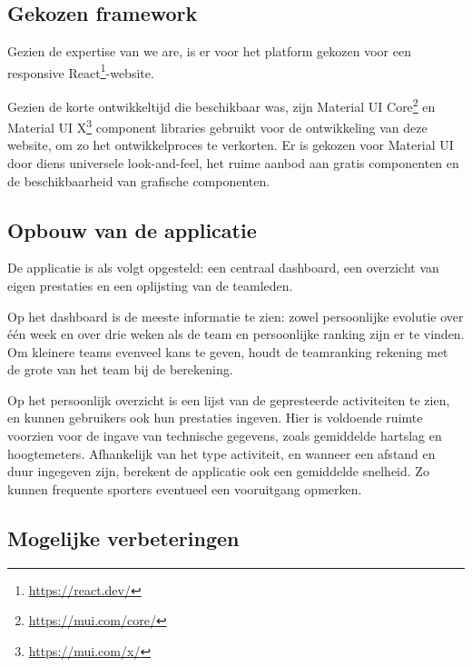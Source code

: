 \chapter{}%
\label{ch:proofofconcept}

\section{Gekozen framework}

Gezien de expertise van we are, is er voor het platform gekozen voor een responsive React\footnote{\href{https://react.dev/}{https://react.dev/}}-website.

Gezien de korte ontwikkeltijd die beschikbaar was, zijn Material UI Core\footnote{\href{https://mui.com/core/}{https://mui.com/core/}} en Material UI X\footnote{\href{https://mui.com/x/}{https://mui.com/x/}} component libraries gebruikt voor de ontwikkeling van deze website, om zo het ontwikkelproces te verkorten. Er is gekozen voor Material UI door diens universele look-and-feel, het ruime aanbod aan gratis componenten en de beschikbaarheid van grafische componenten.

\section{Opbouw van de applicatie}

De applicatie is als volgt opgesteld: een centraal dashboard, een overzicht van eigen prestaties en een oplijsting van de teamleden.

Op het dashboard is de meeste informatie te zien: zowel persoonlijke evolutie over één week en over drie weken als de team en persoonlijke ranking zijn er te vinden. Om kleinere teams evenveel kans te geven, houdt de teamranking rekening met de grote van het team bij de berekening.

Op het persoonlijk overzicht is een lijst van de gepresteerde activiteiten te zien, en kunnen gebruikers ook hun prestaties ingeven. Hier is voldoende ruimte voorzien voor de ingave van technische gegevens, zoals gemiddelde hartslag en hoogtemeters. Afhankelijk van het type activiteit, en wanneer een afstand en duur ingegeven zijn, berekent de applicatie ook een gemiddelde snelheid. Zo kunnen frequente sporters eventueel een vooruitgang opmerken.

\section{Mogelijke verbeteringen}